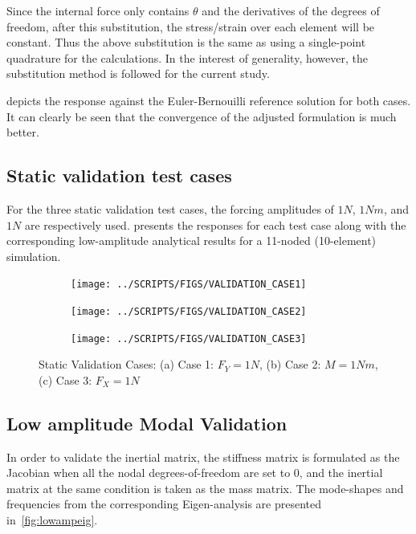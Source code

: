 \documentclass[10pt]{article}
\begin{document}
Since the internal force only contains $\theta$ and the derivatives of
the degrees of freedom, after this substitution, the stress/strain
over each element will be constant. Thus the above substitution is the
same as using a single-point quadrature for the calculations. In the
interest of generality, however, the substitution method is followed
for the current study.

 depicts the response against the Euler-Bernouilli
reference solution for both cases. It can clearly be seen that the
convergence of the adjusted formulation is much better.

\subsection{Static validation test cases}
\label{sec:stat-valid-test}

For the three static validation test cases, the forcing amplitudes of
$1N$, $1Nm$, and $1N$ are respectively used. 
presents the responses for each test case along with the corresponding
low-amplitude analytical results for a 11-noded (10-element)
simulation.

\begin{figure}[!h]
  \centering
  \begin{subfigure}[!h]{0.33\linewidth}
    \centering
    \texttt{[image: ../SCRIPTS/FIGS/VALIDATION\_CASE1]}
    \caption{}
  \end{subfigure}%
  \begin{subfigure}[!h]{0.33\linewidth}
    \centering
    \texttt{[image: ../SCRIPTS/FIGS/VALIDATION\_CASE2]}
    \caption{}
  \end{subfigure}%
  \begin{subfigure}[!h]{0.33\linewidth}
    \centering
    \texttt{[image: ../SCRIPTS/FIGS/VALIDATION\_CASE3]}
    \caption{}
  \end{subfigure}  
  \caption{Static Validation Cases: (a) Case 1: $F_Y=1N$, (b) Case 2:
    $M=1Nm$, (c) Case 3: $F_X=1N$}
  \label{fig:staticval}
\end{figure}

\subsection{Low amplitude Modal Validation}
\label{sec:low-amplitude-modal}

In order to validate the inertial matrix, the stiffness matrix is
formulated as the Jacobian when all the nodal degrees-of-freedom are
set to 0, and the inertial matrix at the same condition is taken as
the mass matrix. The mode-shapes and frequencies from the
corresponding Eigen-analysis are presented in~\cref{fig:lowampeig}.
\end{document}
